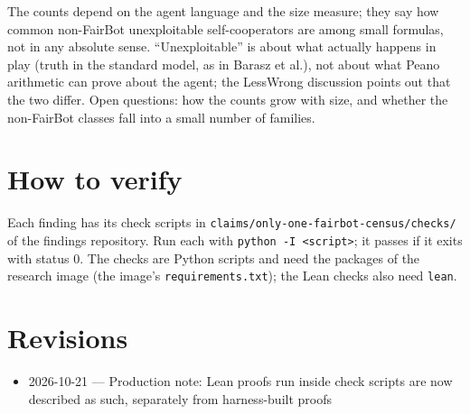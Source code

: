 \documentclass{article}
\begin{document}
The counts depend on the agent language and the size measure; they say how common
non-FairBot unexploitable self-cooperators are among small formulas, not in any absolute sense.
``Unexploitable'' is about what actually happens in play (truth in the standard model, as in Barasz
et al.), not about what Peano arithmetic can prove about the agent; the LessWrong discussion
points out that the two differ. Open questions: how the counts grow with size, and whether the
non-FairBot classes fall into a small number of families.

\section{How to verify}

Each finding has its check scripts in \texttt{claims/only-one-fairbot-census/checks/} of the findings repository. Run each with \texttt{python -I <script>}; it passes if it exits with status 0. The checks are Python scripts and need the packages of the research image (the image's \texttt{requirements.txt}); the Lean checks also need \texttt{lean}.

\section{Revisions}

\begin{itemize}
\item 2026-10-21 --- Production note: Lean proofs run inside check scripts are now described as such, separately from harness-built proofs
\end{itemize}



\end{document}
